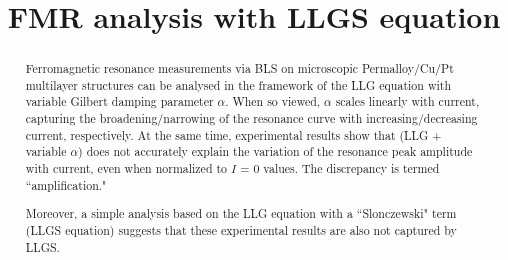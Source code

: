 \documentclass{article}
\title{FMR analysis with LLGS equation}
\begin{document}
\maketitle
\begin{abstract}

Ferromagnetic resonance measurements via BLS on microscopic Permalloy/Cu/Pt multilayer structures can be analysed in the framework of the LLG equation with variable Gilbert damping parameter $\alpha$. When so viewed, $\alpha$ scales linearly with current, capturing the broadening/narrowing of the resonance curve with increasing/decreasing current, respectively. At the same time, experimental results show that (LLG + variable $\alpha$) does not accurately explain the variation of the resonance peak amplitude with current, even when normalized to $I$ = 0 values. The discrepancy is termed ``amplification."

Moreover, a simple analysis based on the LLG equation with a ``Slonczewski" term (LLGS equation) suggests that these experimental results are also not captured by LLGS.
\end{abstract}
\end{document}
